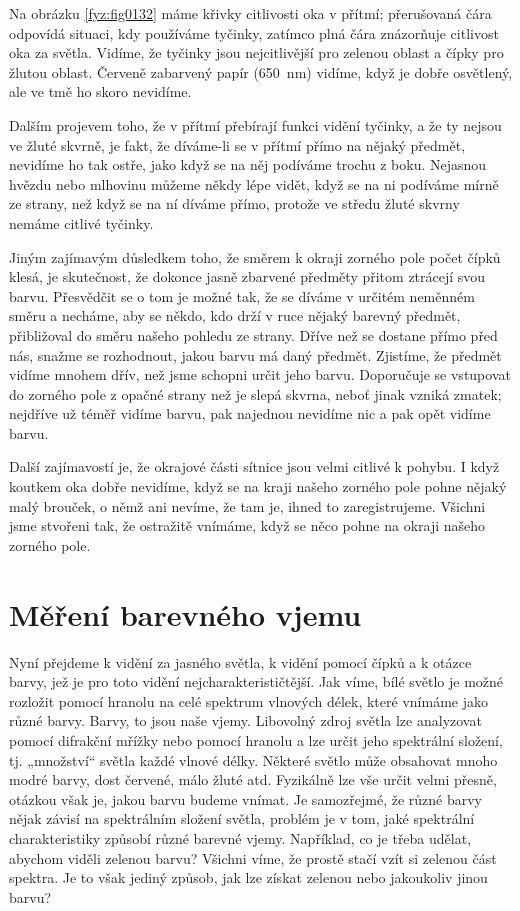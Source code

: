     Na obrázku \ref{fyz:fig0132} máme křivky citlivosti oka v přítmí; přerušovaná čára odpovídá 
    situaci, kdy používáme tyčinky, zatímco plná čára znázorňuje citlivost oka za světla. Vidíme, 
    že tyčinky jsou nejcitlivější pro zelenou oblast a čípky pro žlutou oblast. Červeně zabarvený 
    papír (\SI{650}{\nm}) vidíme, když je dobře osvětlený, ale ve tmě ho skoro nevidíme.
    
    Dalším projevem toho, že v přítmí přebírají funkci vidění tyčinky, a že ty nejsou ve žluté 
    skvrně, je fakt, že díváme-li se v přítmí přímo na nějaký předmět, nevidíme ho tak ostře, jako 
    když se na něj podíváme trochu z boku. Nejasnou hvězdu nebo mlhovinu můžeme někdy lépe vidět, 
    když se na ni podíváme mírně ze strany, než když se na ní díváme přímo, protože ve středu žluté 
    skvrny nemáme citlivé tyčinky.
    
    Jiným zajímavým důsledkem toho, že směrem k okraji zorného pole počet čípků klesá, je 
    skutečnost, že dokonce jasně zbarvené předměty přitom ztrácejí svou barvu. Přesvědčit se o tom 
    je možné tak, že se díváme v určitém neměnném směru a necháme, aby se někdo, kdo drží v ruce 
    nějaký barevný předmět, přibližoval do směru našeho pohledu ze strany. Dříve než se dostane 
    přímo před nás, snažme se rozhodnout, jakou barvu má daný předmět. Zjistíme, že předmět vidíme 
    mnohem dřív, než jsme schopni určit jeho barvu. Doporučuje se vstupovat do zorného pole z 
    opačné strany než je slepá skvrna, neboť jinak vzniká zmatek; nejdříve už téměř vidíme barvu, 
    pak najednou nevidíme nic a pak opět vidíme barvu.
    
    Další zajímavostí je, že okrajové části sítnice jsou velmi citlivé k pohybu. I když koutkem oka 
    dobře nevidíme, když se na kraji našeho zorného pole pohne nějaký malý brouček, o němž ani 
    nevíme, že tam je, ihned to zaregistrujeme. Všichni jsme stvořeni tak, že ostražitě vnímáme, 
    když se něco pohne na okraji našeho zorného pole.
    
  \section{Měření barevného vjemu}\label{fyz:IchapXXXVsecIII}
    Nyní přejdeme k vidění za jasného světla, k vidění pomocí čípků a k otázce barvy, jež je pro 
    toto vidění nejcharakterističtější. Jak víme, bílé světlo je možné rozložit pomocí hranolu na 
    celé spektrum vlnových délek, které vnímáme jako různé barvy. Barvy, to jsou naše vjemy. 
    Libovolný zdroj světla lze analyzovat pomocí difrakční mřížky nebo pomocí hranolu a lze určit 
    jeho spektrální složení, tj. „množství“ světla každé vlnové délky. Některé světlo může 
    obsahovat mnoho modré barvy, dost červené, málo žluté atd. Fyzikálně lze vše určit velmi 
    přesně, otázkou však je, jakou barvu budeme vnímat. Je samozřejmé, že různé barvy nějak závisí 
    na spektrálním složení světla, problém je v tom, jaké spektrální charakteristiky způsobí různé 
    barevné vjemy. Například, co je třeba udělat, abychom viděli zelenou barvu? Všichni víme, že 
    prostě stačí vzít si zelenou část spektra. Je to však jediný způsob, jak lze získat zelenou 
    nebo jakoukoliv jinou barvu?
    
